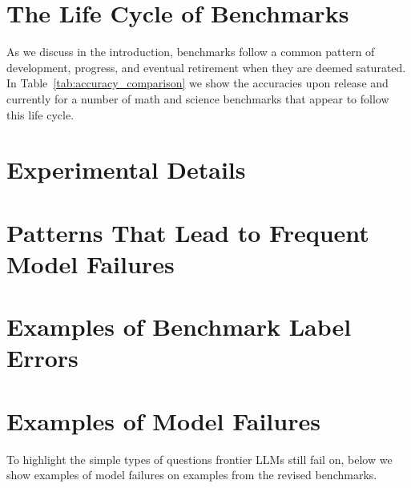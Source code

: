 


\section{The Life Cycle of Benchmarks}
\label{app:accuracy_comparison}

As we discuss in the introduction, benchmarks follow a common pattern of development, progress, and eventual retirement when they are deemed saturated. In Table~\ref{tab:accuracy_comparison} we show the accuracies upon release and currently for a number of math and science benchmarks that appear to follow this life cycle. 


\clearpage

\section{Experimental Details}
\label{app:exp-details}

\clearpage

\section{Patterns That Lead to Frequent Model Failures} \label{app:patterns}

\clearpage


\section{Examples of Benchmark Label Errors} \label{app:label_errors}

\clearpage



\section{Examples of Model Failures}
\label{app:example-failures}
To highlight the simple types of questions frontier LLMs still fail on, below we show examples of model failures on examples from the revised benchmarks.

\vspace{1em}


